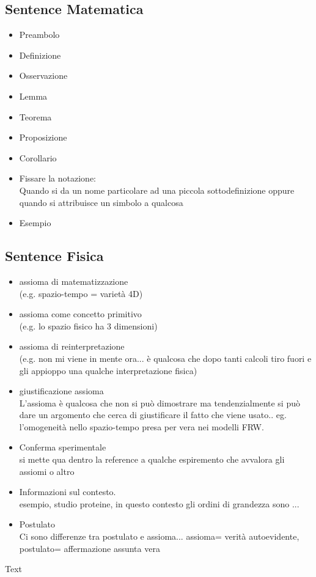 \documentclass[a4paper,12pt]{report}
\begin{document}
\subsection{Sentence Matematica}

\begin{itemize}
 \item Preambolo
 \item Definizione
 \item Osservazione
 \item Lemma
 \item Teorema
 \item Proposizione
 \item Corollario
 \item Fissare la notazione:
 	\\ Quando si da un nome particolare ad una piccola sottodefinizione oppure quando si attribuisce un simbolo a qualcosa
 \item Esempio 	
 \end{itemize}

\subsection{Sentence Fisica}
\begin{itemize}
 \item assioma di matematizzazione 
 	\\(e.g. spazio-tempo = varietà 4D)
 \item assioma come concetto primitivo 
 	\\(e.g. lo spazio fisico ha 3 dimensioni)
 \item assioma di reinterpretazione 
 	\\(e.g. non mi viene in mente ora... è qualcosa che dopo tanti calcoli tiro fuori e gli appioppo una qualche interpretazione fisica)
 \item giustificazione assioma 
 	\\L'assioma è qualcosa che non si può dimostrare ma tendenzialmente si può dare un argomento che cerca di giustificare il fatto che viene usato.. eg. l'omogeneità nello spazio-tempo presa per vera nei modelli FRW.
 \item Conferma sperimentale
 	\\ si mette qua dentro la reference a qualche espiremento che avvalora gli assiomi o altro
 \item Informazioni sul contesto.
 	\\ esempio, studio proteine, in questo contesto gli ordini di grandezza sono ...
 \item Postulato
 	\\Ci sono differenze tra postulato e assioma... assioma= verità autoevidente, postulato= affermazione assunta vera


\end{itemize}

\begin{Warning}
	Text
\end{Warning}
\end{document}

